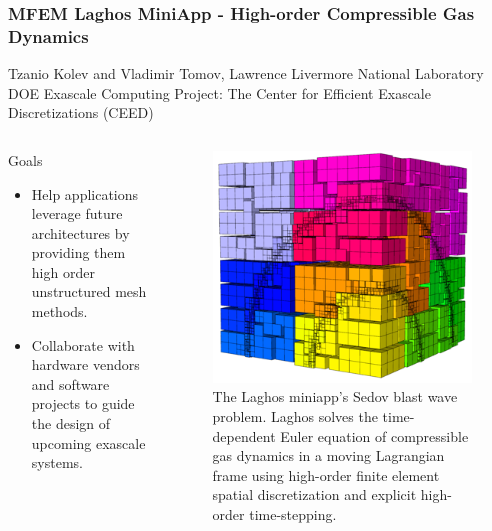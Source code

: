 \documentclass[aspectratio=169]{beamer}
\begin{document}
\begin{frame}
  \frametitle{MFEM Laghos MiniApp - High-order Compressible Gas Dynamics}
  Tzanio Kolev and Vladimir Tomov, Lawrence Livermore National Laboratory \\
  DOE Exascale Computing Project: The Center for Efficient Exascale Discretizations (CEED)
  \begin{columns}
    \begin{column}{0.5\textwidth}
      Goals
      \begin{itemize}
	\item Help applications leverage future architectures by providing them high
          order unstructured mesh methods.
        \item Collaborate with hardware vendors and software projects to guide
          the design of upcoming exascale systems.
      \end{itemize}
    \end{column}
    \begin{column}{0.5\textwidth}
      \begin{figure}
        \centering
        \includegraphics[width=.7\textwidth]{figures/laghos_sedov.png} \\
        \tiny{The Laghos miniapp's Sedov blast wave problem.  Laghos solves the
        time-dependent Euler equation of compressible gas dynamics in a moving
        Lagrangian frame using high-order finite element spatial discretization
        and explicit high-order time-stepping.}
      \end{figure}
    \end{column}
  \end{columns}
\end{frame}
\end{document}
